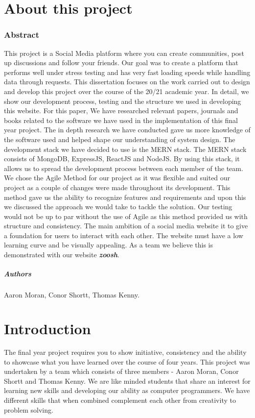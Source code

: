 
\chapter*{About this project}
\subsection{Abstract}
This project is a Social Media platform where you can create communities, post up discussions and follow your friends. Our goal was to create a platform that performs well under stress testing and has very fast loading speeds while handling data through requests.
This dissertation focuses on the work carried out to design and develop this project over the course of the 20/21 academic year. In detail, we show our development process, testing and the structure we used in developing this website. For this paper, We have researched relevant papers, journals and books related to the software we have used in the implementation of this final year project. The in depth research we have conducted gave us more knowledge of the software used and helped shape our understanding of system design. The development stack we have decided to use is the MERN stack. The MERN stack consists of MongoDB, ExpressJS, ReactJS and NodeJS. By using this stack, it allows us to spread the development process between each member of the team. We chose the Agile Method for our project as it was flexible and suited our project as a couple of changes were made throughout its development. This method gave us the ability to recognize features and requirements and upon this we discussed the approach we would take to tackle the solution. Our testing would not be up to par without the use of Agile as this method provided us with structure and consistency. 
The main ambition of a social media website it to give a foundation for users to interact with each other. The website must have a low learning curve and be visually appealing. As a team we believe this is demonstrated with our website \textbf{\textit{zoosh}}.

\paragraph{Authors}
Aaron Moran, Conor Shortt, Thomas Kenny.

\chapter{Introduction}
The final year project requires you to show initiative, consistency and the ability to showcase what you have learned over the course of four years.
This project was undertaken by a team which consists of three members - Aaron Moran, Conor Shortt and Thomas Kenny. We are like minded students that share an interest for learning new skills and developing our ability as computer programmers. We have different skills that when combined complement each other from creativity to problem solving. 
\newline

